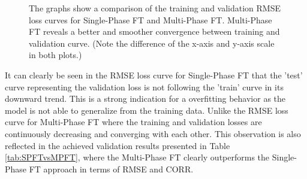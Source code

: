 \begin{figure}[H]
  \centering
  \hfill
  \caption[Ablation study: Multi-Phase FT loss curves]{The graphs show a comparison of the training and validation RMSE loss curves for Single-Phase FT and Multi-Phase FT. Multi-Phase FT reveals a better and smoother convergence between training and validation curve. (Note the difference of the x-axis and y-axis scale in both plots.)}
  \label{fig:SPFTvsMPFT}
\end{figure}

It can clearly be seen in the RMSE loss curve for Single-Phase FT that the 'test' curve representing the validation loss is not following the 'train' curve in its downward trend. This is a strong indication for a overfitting behavior as the model is not able to generalize from the training data. Unlike the RMSE loss curve for Multi-Phase FT where the training and validation losses are continuously decreasing and converging with each other. This observation is also reflected in the achieved validation results presented in Table \ref{tab:SPFTvsMPFT}, where the Multi-Phase FT clearly outperforms the Single-Phase FT approach in terms of RMSE and CORR.

